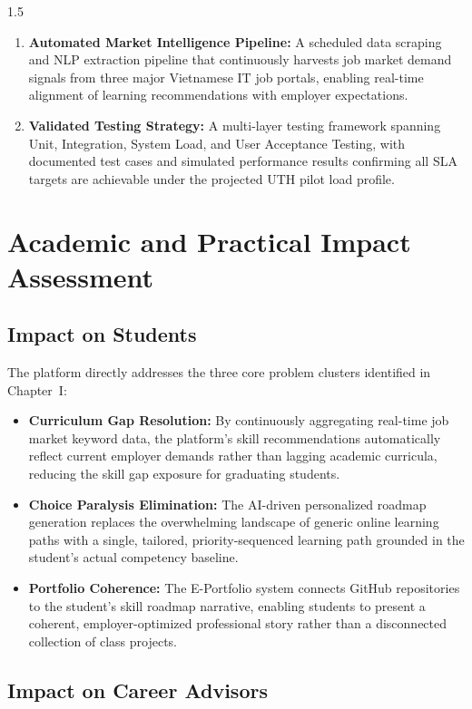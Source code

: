 \documentclass[12pt,a4paper]{report}
\begin{document}
\begin{spacing}{1.5}
\begin{enumerate}
			\item \textbf{Automated Market Intelligence Pipeline:} A scheduled data scraping and NLP extraction pipeline that continuously harvests job market demand signals from three major Vietnamese IT job portals, enabling real-time alignment of learning recommendations with employer expectations.
			
			\item \textbf{Validated Testing Strategy:} A multi-layer testing framework spanning Unit, Integration, System Load, and User Acceptance Testing, with documented test cases and simulated performance results confirming all SLA targets are achievable under the projected UTH pilot load profile.
		\end{enumerate}
		
		\section{Academic and Practical Impact Assessment}
		
		\subsection{Impact on Students}
		
		The platform directly addresses the three core problem clusters identified in Chapter~I:
		
		\begin{itemize}
			\item \textbf{Curriculum Gap Resolution:} By continuously aggregating real-time job market keyword data, the platform's skill recommendations automatically reflect current employer demands rather than lagging academic curricula, reducing the skill gap exposure for graduating students.
			\item \textbf{Choice Paralysis Elimination:} The AI-driven personalized roadmap generation replaces the overwhelming landscape of generic online learning paths with a single, tailored, priority-sequenced learning path grounded in the student's actual competency baseline.
			\item \textbf{Portfolio Coherence:} The E-Portfolio system connects GitHub repositories to the student's skill roadmap narrative, enabling students to present a coherent, employer-optimized professional story rather than a disconnected collection of class projects.
		\end{itemize}
		
		\subsection{Impact on Career Advisors}
		

\end{spacing}
\end{document}
